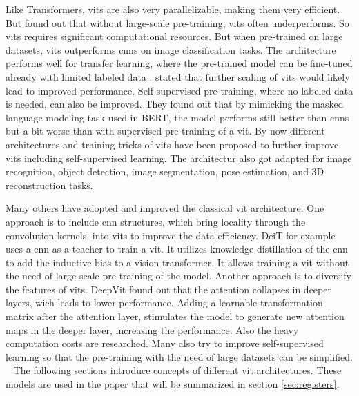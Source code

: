 \documentclass[conference]{IEEEtran}
\begin{document}
  Like Transformers, \acp{vit} are also very parallelizable, making them very efficient. But \cite{visiontransformers2021} found out that without large-scale pre-training, \acp{vit} often underperforms. So \acp{vit} requires significant computational resources. But when pre-trained on large datasets, \acp{vit} outperforms \acp{cnn} on image classification tasks. The architecture performs well for transfer learning, where the pre-trained model can be fine-tuned already with limited labeled data \cite{visiontransformers2021}.  \cite{visiontransformers2021} stated that further scaling of \acp{vit} would likely lead to improved performance. Self-supervised pre-training, where no labeled data is needed, can also be improved. They found out that by mimicking the masked language modeling task used in BERT, the model performs still better than \acp{cnn} but a bit worse than with supervised pre-training of a \ac{vit}. By now different architectures and training tricks of \acp{vit} have been proposed to further improve \acp{vit} including self-supervised learning. The architectur also got adapted for image recognition, object detection, image segmentation, pose estimation, and 3D reconstruction tasks. \cite{vit-state-challenges}

  Many others have adopted and improved the classical \ac{vit} architecture. One approach is to include \ac{cnn} structures, which bring locality through the convolution kernels, into \acp{vit} to improve the data efficiency. DeiT \cite{deit} for example uses a \ac{cnn} as a teacher to train a \ac{vit}. It utilizes knowledge distillation of the \ac{cnn} to add the inductive bias to a vision transformer. It allows training a \ac{vit} without the need of large-scale pre-training of the model. \cite{vit-state-challenges} Another approach is to diversify the features of \acp{vit}. DeepVit \cite{deepvit} found out that the attention collapses in deeper layers, wich leads to lower performance. Adding a learnable transformation matrix after the attention layer, stimulates the model to generate new attention maps in the deeper layer, increasing the performance. \cite{vit-state-challenges} Also the heavy computation costs are researched. Many also try to improve self-supervised learning so that the pre-training with the need of large datasets can be simplified. \cite{vit-state-challenges}
  
  The following sections introduce concepts of different \ac{vit} architectures. These models are used in the paper \cite{registers} that will be summarized in section \ref{sec:registers}.
\end{document}
